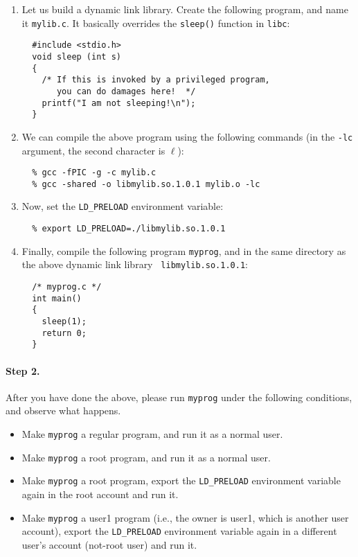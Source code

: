   \begin{enumerate}
  \item Let us build a dynamic link library. Create the following program,
  and name it {\tt mylib.c}. It basically overrides the {\tt sleep()} function 
  in {\tt libc}:
  \begin{lstlisting}
  #include <stdio.h>
  void sleep (int s)
  {
    /* If this is invoked by a privileged program, 
       you can do damages here!  */
    printf("I am not sleeping!\n");
  }
\end{lstlisting}

  \item We can compile the above program using the following commands (in the 
  {\tt -lc} argument, the second character is $\ell$):
  \begin{verbatim}
  % gcc -fPIC -g -c mylib.c
  % gcc -shared -o libmylib.so.1.0.1 mylib.o -lc
  \end{verbatim}

  

  \item Now, set the {\tt LD\_PRELOAD} environment variable:  
  \begin{verbatim}
  % export LD_PRELOAD=./libmylib.so.1.0.1  
  \end{verbatim}

  \item Finally, compile the following program {\tt myprog}, and 
  in the same directory as the above dynamic link library {\tt
  libmylib.so.1.0.1}:
  \begin{lstlisting}
  /* myprog.c */
  int main()
  {
    sleep(1);
    return 0;
  }
\end{lstlisting}
  \end{enumerate}


\paragraph{Step 2.} 
After you have done the above, please run {\tt myprog} under the following
conditions, and observe what happens. 

  \begin{itemize}
  \item Make {\tt myprog} a regular program, and run it as a normal user.
  \item Make {\tt myprog} a \setuid root program, and run it as a normal user.
  \item Make {\tt myprog} a \setuid root program, export the {\tt LD\_PRELOAD}
  environment variable again in the root account and run it. 

  \item Make {\tt myprog} a \setuid user1 program (i.e., the owner is user1, which 
        is another user account), export the {\tt LD\_PRELOAD} environment variable 
	again in a different user's account (not-root user) and run it.
  \end{itemize}


